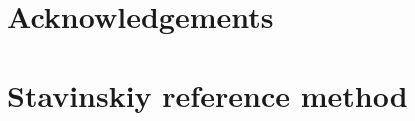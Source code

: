 \documentclass[ALICE,manyauthors]{cernphprep}
\begin{document}
\newenvironment{acknowledgement}{\relax}{\relax}
\begin{acknowledgement}
\section*{Acknowledgements}
\end{acknowledgement}



\newpage
\appendix
%
\renewcommand{\thesubfigure}{\thefigure(\alph{subfigure})}
\makeatletter
\renewcommand{\p@subfigure}{}
\renewcommand{\@thesubfigure}{(\alph{subfigure})\hskip\subfiglabelskip}
%

\section{Stavinskiy reference method}
\label{App:StavMethod}
\end{document}
